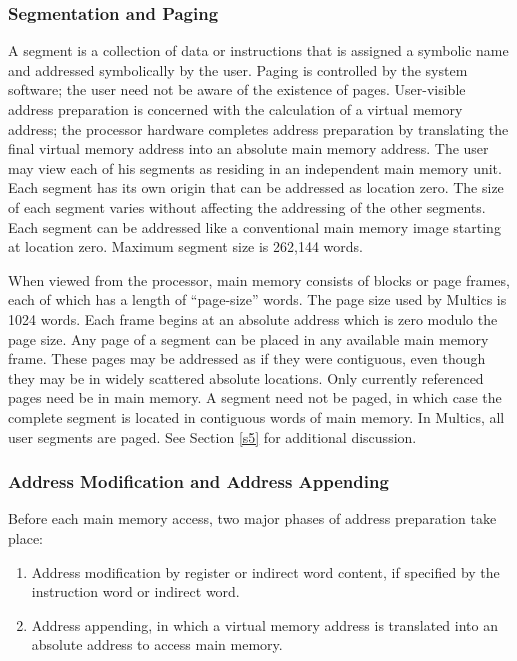\subsubsection{Segmentation and Paging}
A segment is a collection of data or instructions that is assigned a symbolic
name and addressed symbolically by the user. Paging is controlled by the system
software; the user need not be aware of the existence of pages. User-visible
address preparation is concerned with the calculation of a virtual memory
address; the processor hardware completes address preparation by translating
the final virtual memory address into an absolute main memory address. The user
may view each of his segments as residing in an independent main memory unit.
Each segment has its own origin that can be addressed as location zero. The
size of each segment varies without affecting the addressing of the other
segments.  Each segment can be addressed like a conventional main memory image
starting at location zero. Maximum segment size is 262,144 words.

When viewed from the processor, main memory consists of blocks or page frames,
each of which has a length of {``}page-size'' words. The page size used by
Multics is 1024 words. Each frame begins at an absolute address which is zero
modulo the page size. Any page of a segment can be placed in any available main
memory frame. These pages may be addressed as if they were contiguous, even
though they may be in widely scattered absolute locations. Only currently
referenced pages need be in main memory. A segment need not be paged, in which
case the complete segment is located in contiguous words of main memory. In
Multics, all user segments are paged. See Section \ref{s5} for additional discussion.

\subsubsection{Address Modification and Address Appending}

Before each main memory access, two major phases of address preparation take place:

\begin{enumerate}

\item
Address modification by register or indirect word content, if specified by the
instruction word or indirect word.

\item
Address appending, in which a virtual memory address is translated into an
absolute address to access main memory.

\end{enumerate}

